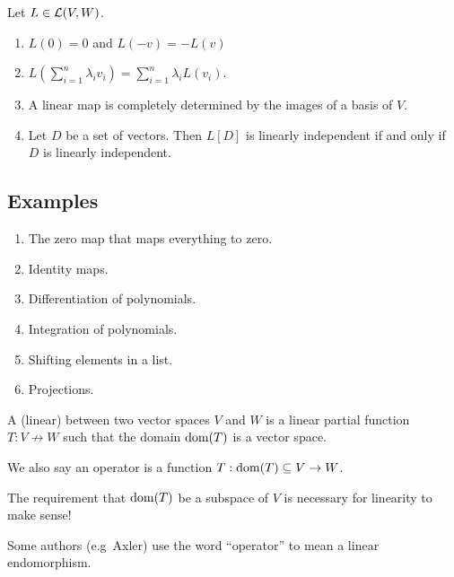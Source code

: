 \begin{lemma} \label{linearMaps}
Let $L\in \operatorname{\mathcal{L}}(V,W)$.
\begin{enumerate}
\item $L(0) = 0$ and $L(-v) = -L(v)$
\item $L\left(\sum^n_{i=1}\lambda_i v_i\right) = \sum_{i=1}^n\lambda_i L(v_i)$.
\item A linear map is completely determined by the images of a basis of $V$.
\item Let $D$ be a set of vectors. Then $L[D]$ is linearly independent \textup{if and only if} $D$ is linearly independent.
\end{enumerate}
\end{lemma}

\subsection{Examples}
\begin{enumerate}
\item The zero map that maps everything to zero.
\item Identity maps.
\item Differentiation of polynomials.
\item Integration of polynomials.
\item Shifting elements in a list.
\item Projections.
\end{enumerate}

\begin{definition}
A (linear)  between two vector spaces $V$ and $W$ is a linear partial function $T: V \not\to W$ such that the domain $\operatorname{dom}(T)$ is a vector space.

We also say an operator is a function $T: \operatorname{dom}(T)\subseteq V\to W$.
\end{definition}
The requirement that $\operatorname{dom}(T)$ be a subspace of $V$ is necessary for linearity to make sense!

Some authors (e.g\ Axler) use the word ``operator'' to mean a linear endomorphism.

